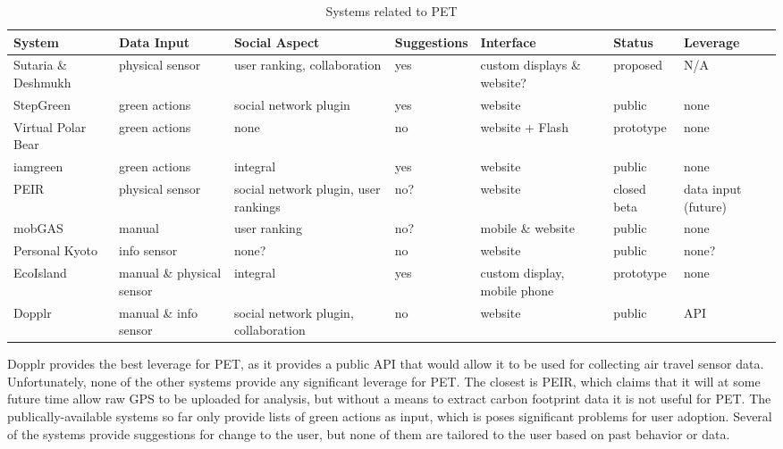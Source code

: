 \begin{table}[htbp]
	\begin{center}
		\begin{minipage}{\textwidth}
		\scriptsize
		\begin{tabular}{| l || p{2cm} | p{2cm} | l | p{2.25cm} | l | p{1.5cm} |}
			\hline
			System & Data Input & Social Aspect & Suggestions & Interface & Status & Leverage \\ \hline \hline
			
			Sutaria \& Deshmukh & physical sensor & user ranking, collaboration & yes & custom displays \& website? & proposed & N/A \\ \hline
			
			StepGreen & green actions & social network plugin & yes & website & public & none \\ \hline
			
			Virtual Polar Bear & green actions & none & no & website + Flash & prototype & none \\ \hline
	
			iamgreen & green actions & integral & yes & website & public & none \\ \hline

			PEIR & physical sensor & social network plugin, user rankings & no? & website & closed beta & data input (future) \\ \hline

			mobGAS & manual & user ranking & no? & mobile \& website & public & none \\ \hline

			Personal Kyoto & info sensor & none? & no & website & public & none? \\ \hline
			EcoIsland & manual \& physical sensor & integral & yes & custom display, mobile phone & prototype & none \\ \hline

			Dopplr & manual \& info sensor & social network plugin, collaboration & no & website & public & API \\ \hline
			
		\end{tabular}
		\end{minipage}
	\caption{Systems related to PET}
	\label{tab:related-work-synthesis}
	\end{center}
\end{table}

Dopplr provides the best leverage for PET, as it provides a public API that would allow it to be used for collecting air travel sensor data. Unfortunately, none of the other systems provide any significant leverage for PET. The closest is PEIR, which claims that it will at some future time allow raw GPS to be uploaded for analysis, but without a means to extract carbon footprint data it is not useful for PET. The publically-available systems so far only provide lists of green actions as input, which is poses significant problems for user adoption. Several of the systems provide suggestions for change to the user, but none of them are tailored to the user based on past behavior or data.


